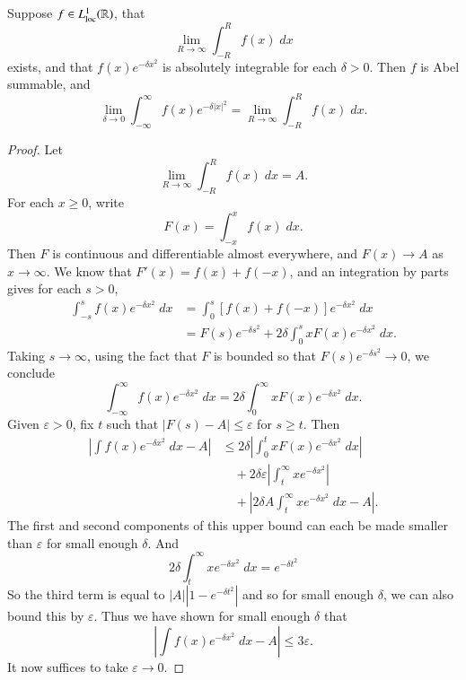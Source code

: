 \begin{lemma}
    Suppose $f \in L^1_{\text{loc}}(\operatorname{\mathbb{R}})$, that
    \[ \lim_{R \to \infty} \int_{-R}^R f(x)\; dx \]
    exists, and that $f(x) e^{-\delta x^2}$ is absolutely integrable for each $\delta > 0$. Then $f$ is Abel summable, and
    \[ \lim_{\delta \to 0} \int_{-\infty}^\infty f(x) e^{-\delta |x|^2} = \lim_{R \to \infty} \int_{-R}^R f(x)\; dx. \]
\end{lemma}
\begin{proof}
    Let
    \[ \lim_{R \to \infty} \int_{-R}^R f(x)\; dx = A. \]
    For each $x \geq 0$, write
    \[ F(x) = \int_{-x}^x f(x)\; dx. \]
    Then $F$ is continuous and differentiable almost everywhere, and $F(x) \to A$ as $x \to \infty$. We know that $F'(x) = f(x) + f(-x)$, and an integration by parts gives for each $s > 0$,
    \begin{align*}
        \int_{-s}^s f(x) e^{-\delta x^2}\; dx &= \int_0^s [f(x) + f(-x)] e^{-\delta x^2}\; dx\\
        &= F(s) e^{-\delta s^2} + 2 \delta \int_0^s x F(x) e^{-\delta x^2}\; dx.
    \end{align*}
    Taking $s \to \infty$, using the fact that $F$ is bounded so that $F(s) e^{-\delta s^2} \to 0$, we conclude
    \[ \int_{-\infty}^\infty f(x) e^{-\delta x^2}\; dx = 2 \delta \int_0^\infty x F(x) e^{-\delta x^2}\; dx. \]
    Given $\varepsilon > 0$, fix $t$ such that $|F(s) - A| \leq \varepsilon$ for $s \geq t$. Then
    \begin{align*}
        \left| \int f(x) e^{-\delta x^2}\; dx - A \right| &\leq 2 \delta \left| \int_0^t x F(x) e^{-\delta x^2}\; dx \right|\\
        &\quad + 2 \delta \varepsilon \left| \int_t^\infty x e^{-\delta x^2} \right|\\
        &\quad + \left| 2 \delta A \int_t^\infty x e^{-\delta x^2}\; dx - A \right|.
    \end{align*}
    The first and second components of this upper bound can each be made smaller than $\varepsilon$ for small enough $\delta$. And
    \[ 2 \delta \int_t^\infty x e^{-\delta x^2}\; dx = e^{-\delta t^2} \]
    So the third term is equal to $|A| |1 - e^{-\delta t^2}|$ and so for small enough $\delta$, we can also bound this by $\varepsilon$. Thus we have shown for small enough $\delta$ that
    \[ \left| \int f(x) e^{-\delta x^2}\; dx - A \right| \leq 3 \varepsilon. \]
    It now suffices to take $\varepsilon \to 0$.
\end{proof}

